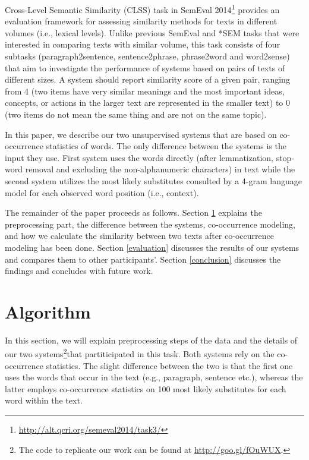 \documentclass[11pt]{article}
\begin{document}
Cross-Level Semantic Similarity (CLSS) task in SemEval 2014\footnote{\url{http://alt.qcri.org/semeval2014/task3/}} \cite{jurgens14task3} provides an evaluation framework for assessing similarity methods for texts in different volumes (i.e., lexical levels). Unlike previous SemEval and *SEM tasks that were interested in comparing texts with similar volume, this task consists of four subtasks (paragraph2sentence, sentence2phrase, phrase2word and word2sense) that aim to investigate the performance of systems based on pairs of texts of different sizes. A system should report similarity score of a given pair, ranging from 4 (two items have very similar meanings and the most important ideas, concepts, or actions in the larger text are represented in the smaller text) to 0 (two items do not mean the same thing and are not on the same topic).

In this paper, we describe our two unsupervised systems that are based on co-occurrence statistics of words. The only difference between the systems is the input they use. First system uses the words directly (after lemmatization, stop-word removal and excluding the non-alphanumeric characters) in text while the second system utilizes the most likely substitutes consulted by a 4-gram language model for each observed word position (i.e., context). 


The remainder of the paper proceeds as follows. Section \ref{algorithm} explains the preprocessing part, the difference between the systems, co-occurrence modeling, and how we calculate the similarity between two texts after co-occurrence modeling has been done. Section \ref{evaluation} discusses the results of our systems and compares them to other participants'. Section \ref{conclusion} discusses the findings and concludes with future work.

\section{Algorithm}
\label{algorithm}
In this section, we will explain preprocessing steps of the data and the details of our two systems\footnote{The code to replicate our work can be found at \url{http://goo.gl/fOuWUX}.}that partiticipated in this task. Both systems rely on the co-occurrence statistics. The slight difference between the two is that the first one uses the words that occur in the text (e.g., paragraph, sentence etc.), whereas the latter employs co-occurrence statistics on 100 most likely substitutes for each word within the text. 
\end{document}
